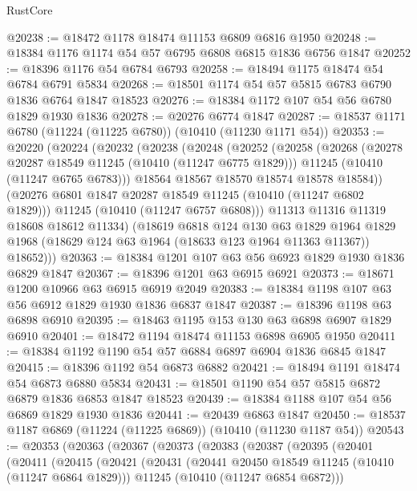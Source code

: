 \begin{lexlean}{RustCore}
\begin{coremodule}
@20238 := @18472 @1178 @18474 @11153 @6809 @6816 @1950
@20248 := @18384 @1176 @1174 @54 @57 @6795 @6808 @6815 @1836 @6756 @1847
@20252 := @18396 @1176 @54 @6784 @6793
@20258 := @18494 @1175 @18474 @54 @6784 @6791 @5834
@20268 := @18501 @1174 @54 @57 @5815 @6783 @6790 @1836 @6764 @1847 @18523
@20276 := @18384 @1172 @107 @54 @56 @6780 @1829 @1930 @1836
@20278 := @20276 @6774 @1847
@20287 := @18537 @1171 @6780 (@11224 (@11225 @6780)) (@10410 (@11230 @1171 @54))
@20353 := @20220
    (@20224
      (@20232
        (@20238
          (@20248
            (@20252
              (@20258
                (@20268
                  (@20278 @20287 @18549 @11245 (@10410 (@11247 @6775 @1829)))
                  @11245
                  (@10410 (@11247 @6765 @6783)))
                @18564
                @18567
                @18570
                @18574
                @18578
                @18584))
            (@20276 @6801 @1847 @20287 @18549 @11245 (@10410 (@11247 @6802 @1829)))
            @11245
            (@10410 (@11247 @6757 @6808)))
          @11313
          @11316
          @11319
          @18608
          @18612
          @11334)
        (@18619
          @6818
          @124
          @130
          @63
          @1829
          @1964
          @1829
          @1968
          (@18629 @124 @63 @1964 (@18633 @123 @1964 @11363 @11367))
          @18652)))
@20363 := @18384 @1201 @107 @63 @56 @6923 @1829 @1930 @1836 @6829 @1847
@20367 := @18396 @1201 @63 @6915 @6921
@20373 := @18671 @1200 @10966 @63 @6915 @6919 @2049
@20383 := @18384 @1198 @107 @63 @56 @6912 @1829 @1930 @1836 @6837 @1847
@20387 := @18396 @1198 @63 @6898 @6910
@20395 := @18463 @1195 @153 @130 @63 @6898 @6907 @1829 @6910
@20401 := @18472 @1194 @18474 @11153 @6898 @6905 @1950
@20411 := @18384 @1192 @1190 @54 @57 @6884 @6897 @6904 @1836 @6845 @1847
@20415 := @18396 @1192 @54 @6873 @6882
@20421 := @18494 @1191 @18474 @54 @6873 @6880 @5834
@20431 := @18501 @1190 @54 @57 @5815 @6872 @6879 @1836 @6853 @1847 @18523
@20439 := @18384 @1188 @107 @54 @56 @6869 @1829 @1930 @1836
@20441 := @20439 @6863 @1847
@20450 := @18537 @1187 @6869 (@11224 (@11225 @6869)) (@10410 (@11230 @1187 @54))
@20543 := @20353
    (@20363
      (@20367
        (@20373
          (@20383
            (@20387
              (@20395
                (@20401
                  (@20411
                    (@20415
                      (@20421
                        (@20431
                          (@20441 @20450 @18549 @11245 (@10410 (@11247 @6864 @1829)))
                          @11245
                          (@10410 (@11247 @6854 @6872)))

\end{coremodule}
\end{lexlean}
